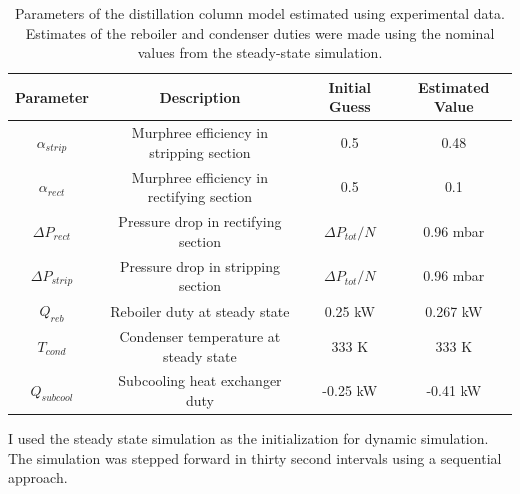\begin{table}
    \centering
    \caption{Parameters of the distillation column model estimated using experimental data. Estimates of the reboiler and condenser duties were made using the nominal values from the steady-state simulation.}
    \begin{tabular}{cccc}
        \textbf{Parameter} & \textbf{Description} & \textbf{Initial Guess} & \textbf{Estimated Value}  \\
        \hline
         $\alpha_{strip}$ & Murphree efficiency in stripping section &  0.5 & 0.48 \\ 
         $\alpha_{rect}$ & Murphree efficiency in rectifying section & 0.5 & 0.1 \\
         $\Delta P_{rect}$ & Pressure drop in rectifying section &  $\Delta P_{tot}/N$ & 0.96 mbar \\ 
         $\Delta P_{strip}$ & Pressure drop in stripping section &  $\Delta P_{tot}/N$ & 0.96 mbar \\ 
         $ Q_{reb}$ & Reboiler duty at steady state &  0.25 kW  & 0.267 kW  \\
         $ T_{cond}$ & Condenser temperature at steady state &  333 K  & 333 K\\
         $ Q_{subcool}$ & Subcooling heat exchanger duty & -0.25  kW & -0.41 kW \\
         \hline
    \end{tabular}
    \label{tab:param_estimation}
\end{table}

I used the steady state simulation as the initialization for dynamic simulation. The simulation was stepped forward in thirty second intervals using a sequential approach. 




